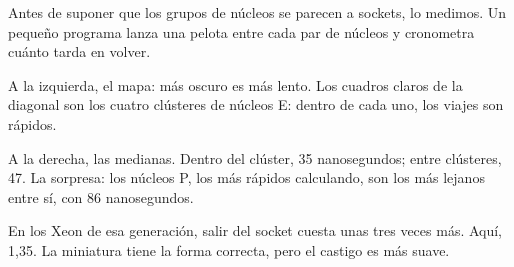 Antes de suponer que los grupos de núcleos se parecen a sockets, lo medimos. Un pequeño programa lanza una pelota entre cada par de núcleos y cronometra cuánto tarda en volver.

A la izquierda, el mapa: más oscuro es más lento. Los cuadros claros de la diagonal son los cuatro clústeres de núcleos E: dentro de cada uno, los viajes son rápidos.

A la derecha, las medianas. Dentro del clúster, 35 nanosegundos; entre clústeres, 47. La sorpresa: los núcleos P, los más rápidos calculando, son los más lejanos entre sí, con 86 nanosegundos.

En los Xeon de esa generación, salir del socket cuesta unas tres veces más. Aquí, 1,35. La miniatura tiene la forma correcta, pero el castigo es más suave.
